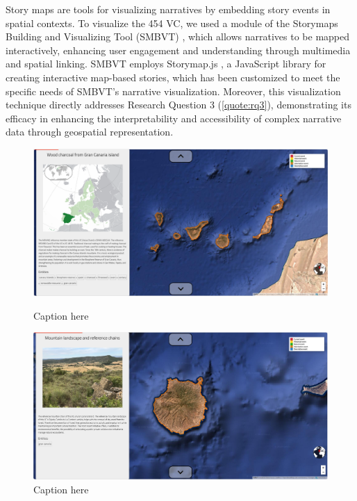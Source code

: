 Story maps are tools for visualizing narratives by embedding story events in spatial contexts. To visualize the 454 VC, we used a module of the Storymaps Building and Visualizing Tool (SMBVT) \cite{bartalesiWebToolCreate2023b}, which allows narratives to be mapped interactively, enhancing user engagement and understanding through multimedia and spatial linking. SMBVT employs Storymap.js \cite{zhaoJakobzhaoStorymap2024}, a JavaScript library for creating interactive map-based stories, which has been customized to meet the specific needs of SMBVT’s narrative visualization. Moreover, this visualization technique directly addresses Research Question 3 (\ref{quote:rq3}), demonstrating its efficacy in enhancing the interpretability and accessibility of complex narrative data through geospatial representation.

\begin{figure}[h!tb]
\begin{multicols}{2}
    \includegraphics[width=\linewidth]{img/charcoal1.png}
    \caption{Caption here}\label{fig:charcoal1}\par 
    \includegraphics[width=\linewidth]{img/charcoal2.png}
    \caption{Caption here}\label{fig:charcoal2}\par 
\end{multicols}

\end{figure}
